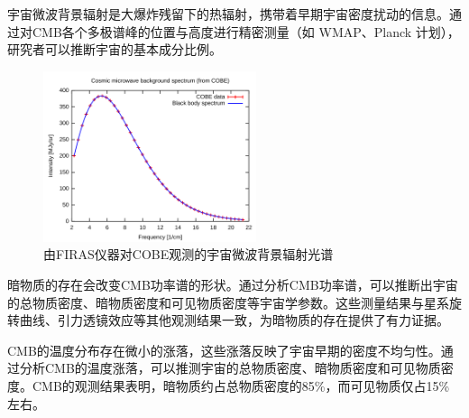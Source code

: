 宇宙微波背景辐射是大爆炸残留下的热辐射，携带着早期宇宙密度扰动的信息。通过对CMB各个多极谱峰的位置与高度进行精密测量（如 WMAP、Planck 计划），研究者可以推断宇宙的基本成分比例。

\begin{figure}[!htbp]
    \centering    
    \includegraphics[height=5cm]{Img/2-3.png}
    \caption{由FIRAS仪器对COBE观测的宇宙微波背景辐射光谱 }
    \label{2-3}
\end{figure}

暗物质的存在会改变CMB功率谱的形状。通过分析CMB功率谱，可以推断出宇宙的总物质密度、暗物质密度和可见物质密度等宇宙学参数。这些测量结果与星系旋转曲线、引力透镜效应等其他观测结果一致，为暗物质的存在提供了有力证据。

CMB的温度分布存在微小的涨落，这些涨落反映了宇宙早期的密度不均匀性。通过分析CMB的温度涨落，可以推测宇宙的总物质密度、暗物质密度和可见物质密度。CMB的观测结果表明，暗物质约占总物质密度的85\%，而可见物质仅占15\%左右。

\newpage